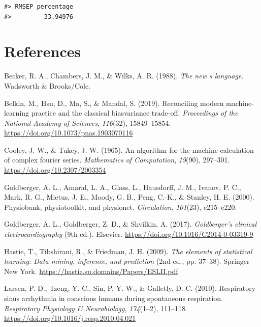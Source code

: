 \documentclass[
]{article}
\newlength{\cslhangindent}
\newlength{\cslentryspacingunit} %
\newenvironment{CSLReferences}[2] %
 {%
  \setlength{\parindent}{0pt}
  \ifodd #1
  \let\oldpar\par
  \def\par{\hangindent=\cslhangindent\oldpar}
  \fi
  \setlength{\parskip}{#2\cslentryspacingunit}
 }%
 {}
\begin{document}
\begin{verbatim}
#> RMSEP percentage 
#>         33.94976
\end{verbatim}

\newpage

\hypertarget{references}{%
\section*{References}\label{references}}

\hypertarget{refs}{}
\begin{CSLReferences}{1}{1}
\leavevmode{}%
Becker, R. A., Chambers, J. M., \& Wilks, A. R. (1988). \emph{The new s
language}. Wadsworth \& Brooks/Cole.

\leavevmode{}%
Belkin, M., Hsu, D., Ma, S., \& Mandal, S. (2019). Reconciling modern
machine-learning practice and the classical bias{\textendash}variance
trade-off. \emph{Proceedings of the National Academy of Sciences},
\emph{116}(32), 15849--15854.
\url{https://doi.org/10.1073/pnas.1903070116}

\leavevmode{}%
Cooley, J. W., \& Tukey, J. W. (1965). An algorithm for the machine
calculation of complex fourier series. \emph{Mathematics of
Computation}, \emph{19}(90), 297--301.
\url{https://doi.org/10.2307/2003354}

\leavevmode{}%
Goldberger, A. L., Amaral, L. A., Glass, L., Hausdorff, J. M., Ivanov,
P. C., Mark, R. G., Mietus, J. E., Moody, G. B., Peng, C.-K., \&
Stanley, H. E. (2000). Physiobank, physiotoolkit, and physionet.
\emph{Circulation}, \emph{101}(23), e215--e220.

\leavevmode{}%
Goldberger, A. L., Goldberger, Z. D., \& Shvilkin, A. (2017).
\emph{Goldberger's clinical electrocardiography} (9th ed.). Elsevier.
\url{https://doi.org/10.1016/C2014-0-03319-9}

\leavevmode{}%
Hastie, T., Tibshirani, R., \& Friedman, J. H. (2009). \emph{The
elements of statistical learning: Data mining, inference, and
prediction} (2nd ed., pp. 37--38). Springer New York.
\url{https://hastie.su.domains/Papers/ESLII.pdf}

\leavevmode{}%
Larsen, P. D., Tzeng, Y. C., Sin, P. Y. W., \& Galletly, D. C. (2010).
Respiratory sinus arrhythmia in conscious humans during spontaneous
respiration. \emph{Respiratory Physiology \& Neurobiology},
\emph{174}(1--2), 111--118.
\url{https://doi.org/10.1016/j.resp.2010.04.021}


\end{CSLReferences}
\end{document}
